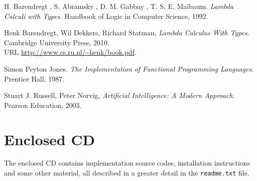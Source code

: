 \documentclass[12pt,a4paper]{report}
\begin{document}
\begin{thebibliography}{9}
H. Barendregt , S. Abramsky , D. M. Gabbay , T. S. E. Maibaum.
\emph{Lambda Calculi with Types.} 
Handbook of Logic in Computer Science, 1992. 


  Henk Barendregt, Wil Dekkers, Richard Statman,
  \emph{Lambda Calculus With Types}.
  Cambridge University Press,
  2010. \\
  URL \url{http://www.cs.ru.nl/~henk/book.pdf}.

Simon Peyton Jones. 
\emph{The Implementation of Functional Programming Languages}. 
Prentice Hall, 1987.


	Stuart J. Russell, Peter Norvig,
	\emph{Artificial Intelligence: A Modern Approach}.
	Pearson Education,
	2003. 

\end{thebibliography}


\appendix
\chapter{Enclosed CD}

The enclosed CD contains implementation source codes,
installation instructions and some other material, 
all described in a greater detail in the \texttt{readme.txt}
file.
	
	
\end{document}
